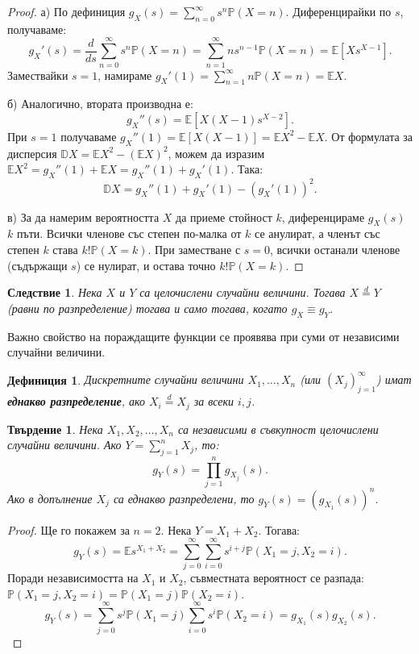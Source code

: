 \documentclass{article}
\newtheorem{theorem}{Твърдение}
\newtheorem{definition}{Дефиниция}
\newtheorem{corollary}{Следствие}
\begin{document}
\begin{proof}
а) По дефиниция $g_X(s) = \sum_{n=0}^{\infty} s^n \mathbb{P}(X=n)$. Диференцирайки по $s$, получаваме:
\[ g_X'(s) = \frac{d}{ds} \sum_{n=0}^{\infty} s^n \mathbb{P}(X=n) = \sum_{n=1}^{\infty} n s^{n-1} \mathbb{P}(X=n) = \mathbb{E}[X s^{X-1}]. \]
Замествайки $s=1$, намираме $g_X'(1) = \sum_{n=1}^{\infty} n \mathbb{P}(X=n) = \mathbb{E}X$.

б) Аналогично, втората производна е:
\[ g_X''(s) = \mathbb{E}[X(X-1)s^{X-2}]. \]
При $s=1$ получаваме $g_X''(1) = \mathbb{E}[X(X-1)] = \mathbb{E}X^2 - \mathbb{E}X$. 
От формулата за дисперсия $\mathbb{D}X = \mathbb{E}X^2 - (\mathbb{E}X)^2$, можем да изразим $\mathbb{E}X^2 = g_X''(1) + \mathbb{E}X = g_X''(1) + g_X'(1)$. Така:
\[ \mathbb{D}X = g_X''(1) + g_X'(1) - (g_X'(1))^2. \]

в) За да намерим вероятността $X$ да приеме стойност $k$, диференцираме $g_X(s)$ $k$ пъти. Всички членове със степен по-малка от $k$ се анулират, а членът със степен $k$ става $k! \mathbb{P}(X=k)$. При заместване с $s=0$, всички останали членове (съдържащи $s$) се нулират, и остава точно $k! \mathbb{P}(X=k)$.
\end{proof}

\begin{corollary}
Нека $X$ и $Y$ са целочислени случайни величини. Тогава $X \stackrel{d}{=} Y$ (равни по разпределение) тогава и само тогава, когато $g_X \equiv g_Y$.
\end{corollary}

Важно свойство на пораждащите функции се проявява при суми от независими случайни величини. 

\begin{definition}
Дискретните случайни величини $X_1, \dots, X_n$ (или $(X_j)_{j=1}^\infty$) имат \textbf{еднакво разпределение}, ако $X_i \stackrel{d}{=} X_j$ за всеки $i, j$.
\end{definition}

\begin{theorem}
Нека $X_1, X_2, \dots, X_n$ са независими в съвкупност целочислени случайни величини. Ако $Y = \sum_{j=1}^n X_j$, то:
\[ g_Y(s) = \prod_{j=1}^n g_{X_j}(s). \]
Ако в допълнение $X_j$ са еднакво разпределени, то $g_Y(s) = (g_{X_1}(s))^n$.
\end{theorem}
\begin{proof}
Ще го покажем за $n=2$. Нека $Y = X_1 + X_2$. Тогава:
\[ g_Y(s) = \mathbb{E}s^{X_1+X_2} = \sum_{j=0}^{\infty} \sum_{i=0}^{\infty} s^{i+j} \mathbb{P}(X_1=j, X_2=i). \]
Поради независимостта на $X_1$ и $X_2$, съвместната вероятност се разпада: $\mathbb{P}(X_1=j, X_2=i) = \mathbb{P}(X_1=j)\mathbb{P}(X_2=i)$.
\[ g_Y(s) = \sum_{j=0}^{\infty} s^j \mathbb{P}(X_1=j) \sum_{i=0}^{\infty} s^i \mathbb{P}(X_2=i) = g_{X_1}(s) g_{X_2}(s). \]
\end{proof}
\end{document}
